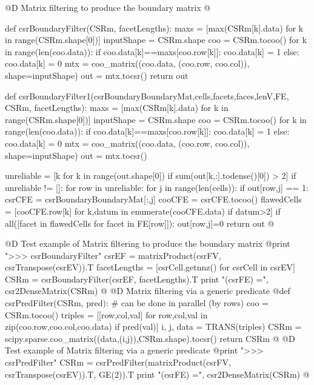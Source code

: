 \documentclass[11pt,oneside]{article}    %
\begin{document}
@D Matrix filtering to produce the boundary matrix
@{def csrBoundaryFilter(CSRm, facetLengths):
    maxs = [max(CSRm[k].data) for k in range(CSRm.shape[0])]
    inputShape = CSRm.shape
    coo = CSRm.tocoo()
    for k in range(len(coo.data)):
        if coo.data[k]==maxs[coo.row[k]]: coo.data[k] = 1
        else: coo.data[k] = 0
    mtx = coo_matrix((coo.data, (coo.row, coo.col)), shape=inputShape)
    out = mtx.tocsr()
    return out

def csrBoundaryFilter1(csrBoundaryBoundaryMat,cells,facets,faces,lenV,FE, CSRm, facetLengths):
    maxs = [max(CSRm[k].data) for k in range(CSRm.shape[0])]
    inputShape = CSRm.shape
    coo = CSRm.tocoo()
    for k in range(len(coo.data)):
        if coo.data[k]==maxs[coo.row[k]]: coo.data[k] = 1
        else: coo.data[k] = 0
    mtx = coo_matrix((coo.data, (coo.row, coo.col)), shape=inputShape)
    out = mtx.tocsr()
    
    unreliable = [k for k in range(out.shape[0]) if sum(out[k,:].todense()[0]) > 2]
    if unreliable != []:
        for row in unreliable:
            for j in range(len(cells)):
                if out[row,j] == 1:
                    csrCFE = csrBoundaryBoundaryMat[:,j]
                    cooCFE = csrCFE.tocoo()
                    flawedCells = [cooCFE.row[k] for k,datum in enumerate(cooCFE.data)
                        if datum>2]
                    if all([facet in flawedCells  for facet in FE[row]]):
                        out[row,j]=0
    return out
@}
@D Test example of Matrix filtering to produce the boundary matrix
@{print "\n>>> csrBoundaryFilter"
csrEF = matrixProduct(csrFV, csrTranspose(csrEV)).T
facetLengths = [csrCell.getnnz() for csrCell in csrEV]
CSRm = csrBoundaryFilter(csrEF, facetLengths).T
print "\ncsrMaxFilter(csrFE) =\n", csr2DenseMatrix(CSRm)
@}
@D Matrix filtering via a generic predicate
@{def csrPredFilter(CSRm, pred):
    # can be done in parallel (by rows)
    coo = CSRm.tocoo()
    triples = [[row,col,val] for row,col,val 
                in zip(coo.row,coo.col,coo.data) if pred(val)]
    i, j, data = TRANS(triples)
    CSRm = scipy.sparse.coo_matrix((data,(i,j)),CSRm.shape).tocsr()
    return CSRm
@}
@D Test example of Matrix filtering via a generic predicate
@{print "\n>>> csrPredFilter"
CSRm = csrPredFilter(matrixProduct(csrFV, csrTranspose(csrEV)).T, GE(2)).T
print "\nccsrPredFilter(csrFE) =\n", csr2DenseMatrix(CSRm)
@}
\end{document}
